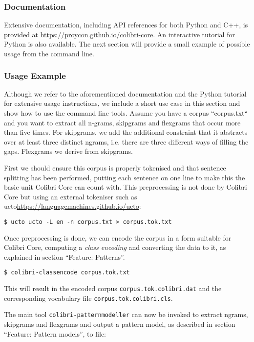 \documentclass[a4paper,12pt]{article}
\begin{document}
\subsubsection{Documentation} 

Extensive documentation, including API references for both Python and C++, is provided at
\url{https://proycon.github.io/colibri-core}. An interactive tutorial for Python is also
available. The next section will provide a small example of possible usage from the command line.

\subsubsection{Usage Example}

Although we refer to the aforementioned documentation and the Python tutorial
for extensive usage instructions, we include a short use case in this section
and show how to use the command line tools.  Assume you have a corpus
``corpus.txt`` and you want to extract all n-grams, skipgrams and flexgrams
that occur more than five times. For skipgrams, we add the additional
constraint that it abstracts over at least three distinct ngrams, i.e. there
are three different ways of filling the gaps. Flexgrams we derive from
skipgrams.

First we should ensure this corpus is properly tokenised and that sentence
splitting has been performed, putting each sentence on one line to make this
the basic unit Colibri Core can count with. This preprocessing is not done by
Colibri Core but using an external tokeniser such as ucto\url{https://languagemachines.github.io/ucto}:

\begin{verbatim}
$ ucto ucto -L en -n corpus.txt > corpus.tok.txt
\end{verbatim}

Once preprocessing is done, we can encode the corpus in a form suitable for
Colibri Core, computing a \emph{class encoding} and converting the data to it,
as explained in section ``Feature: Patterns''.

\begin{verbatim}
$ colibri-classencode corpus.tok.txt 
\end{verbatim}

This will result in the encoded corpus \texttt{corpus.tok.colibri.dat} and the corresponding vocabulary file \texttt{corpus.tok.colibri.cls}.

The main tool \texttt{colibri-patternmodeller} can now be invoked to extract
ngrams, skipgrams and flexgrams and output a pattern model, as described in
section ``Feature: Pattern models'', to file:
\end{document}
